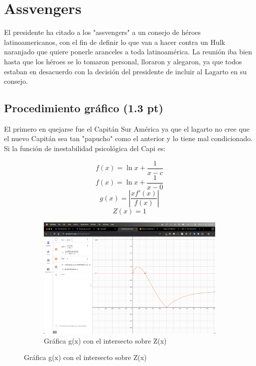 \section{Assvengers}

El presidente ha citado a los "assvengers" a un consejo de héroes latinoamericanos, con el fin de  definir lo que van a hacer contra un Hulk naranjado que quiere ponerle aranceles  a toda latinoamérica. La reunión  iba bien hasta que los héroes se lo tomaron personal, lloraron y alegaron, ya que todos estaban en desacuerdo con la decisión del presidente  de incluir  al Lagarto  en su consejo.

\subsection{Procedimiento gráfico (1.3 pt)}

El primero en quejarse fue el Capitán Sur América ya que el lagarto no cree que el nuevo Capitán  sea tan "papucho" como el anterior y lo tiene mal condicionado. Si la función de inestabilidad psicológica del Capi es:

\[ f(x) = \ln{x} + \frac{1}{x-c} \]
\[ f(x) = \ln{x} + \frac{1}{x-0} \]
\[ g(x) = \left|\frac{xf'(x)}{f(x)}\right| \]
\[ Z(x) = 1 \]

\begin{figure}[H]
    \centering
    \begin{subfigure}[b]{\textwidth}
        \centering
        \includegraphics[width=\textwidth]{Figures/0. General/1.1.png}
        \caption{Gráfica g(x) con el intersecto sobre Z(x)}
        \label{fig: Grafica g(x)}
    \end{subfigure}
\end{figure}

